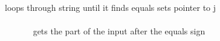 loops through string until it finds equals sets pointer to j ~\newline
~\newline
~\newline
~\newline
~\newline
~\newline
~\newline
~\newline
~\newline
~\newline
~\newline
~\newline
~\newline
~\newline
~\newline
~\newline
~\newline
~\newline
~\newline
~\newline
~\newline
~\newline
~\newline
~\newline
~\newline
~\newline
~\newline
~\newline
~\newline
~\newline
~\newline
~\newline
~\newline
~\newline
~\newline
~\newline
~\newline
~\newline
~\newline
~\newline
~\newline
~\newline
~\newline
~\newline
~\newline
~\newline
~\newline
~\newline
~\newline
~\newline
~\newline
~\newline
~\newline
~\newline
~\newline
~\newline
~\newline
~\newline
~\newline
~\newline
 gets the part of the input after the equals sign

